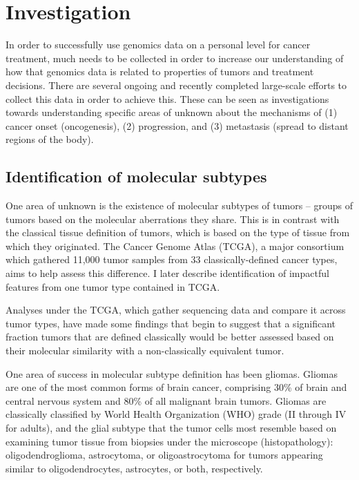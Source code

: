 \section{Investigation}
	In order to successfully use genomics data on a personal level
        for cancer treatment, much needs to be collected in order to
        increase our understanding of how that genomics data is
        related to properties of tumors and treatment decisions. There
        are several ongoing and recently completed large-scale efforts
        to collect this data in order to achieve this. These can be
        seen as investigations towards understanding specific areas of
        unknown about the mechanisms of (1) cancer onset (oncogenesis),
        (2) progression, and (3) metastasis (spread to distant regions of
        the body).


        \subsection{Identification of molecular subtypes}

	One area of unknown is the existence of molecular subtypes of
        tumors – groups of tumors based on the molecular aberrations
        they share. This is in contrast with the classical tissue
        definition of tumors, which is based on the type of tissue
        from which they originated. The Cancer Genome Atlas (TCGA)\cite{mclendon_comprehensive_2008}, a
        major consortium which gathered 11,000 tumor samples from 33
        classically-defined cancer types, aims to help assess this
        difference. I later describe identification of impactful
        features from one tumor type contained in TCGA. 
        
        Analyses under the TCGA, which gather sequencing data and compare it
        across tumor types, have made some findings that begin to suggest that
        a significant fraction tumors that are defined classically would be
        better assessed based on their molecular similarity with a
        non-classically equivalent tumor.

        One area of success in molecular subtype definition has been
        gliomas. Gliomas are one of the most common forms of brain
        cancer, comprising 30\% of brain and central nervous system
        and 80\% of all malignant brain tumors. Gliomas are
        classically classified by World Health Organization (WHO)
        grade (II through IV for adults), and the glial subtype that
        the tumor cells most resemble based on examining tumor tissue
        from biopsies under the microscope (histopathology):
        oligodendroglioma, astrocytoma, or oligoastrocytoma for tumors
        appearing similar to oligodendrocytes, astrocytes, or both,
        respectively. 
        

